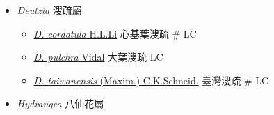 
  \begin{itemize}
 \item[] \textit{Deutzia} 溲疏屬
                                
  \begin{itemize}
        \item[] \href{http://www.theplantlist.org/tpl1.1/search?q=Deutzia+cordatula}{\textit{D. cordatula} H.L.Li}   心基葉溲疏  \# LC
        \item[] \href{http://www.theplantlist.org/tpl1.1/search?q=Deutzia+pulchra}{\textit{D. pulchra} Vidal}   大葉溲疏   LC
        \item[] \href{http://www.theplantlist.org/tpl1.1/search?q=Deutzia+taiwanensis}{\textit{D. taiwanensis} (Maxim.) C.K.Schneid.}   臺灣溲疏  \# LC
  \end{itemize}
 \item[] \textit{Hydrangea} 八仙花屬
                                

\end{itemize}
